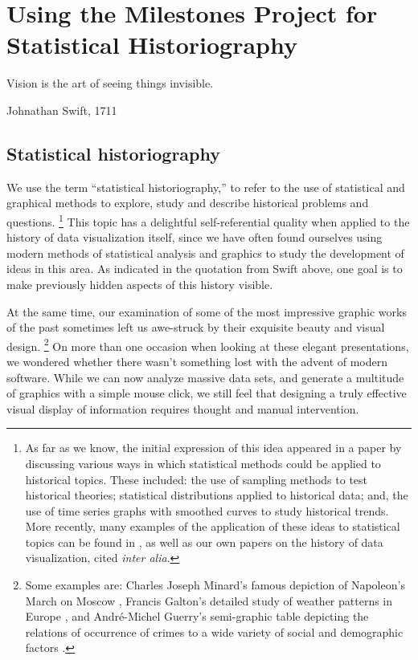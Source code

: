 \section{Using the Milestones Project for Statistical Historiography}\label{sec:historiography}
\epigraph{Vision is the art of seeing things invisible.}{Johnathan Swift, 1711}

\subsection{Statistical historiography}\label{sec:stathist}
We use the term ``statistical historiography,'' to refer to the use of statistical and graphical methods to explore, study and describe historical problems and questions.%
\footnote{As far as we know, the initial expression of this idea appeared in a paper by \citet{Rubin:1943} discussing various ways in which statistical methods could be applied to historical topics.  These included: the use of sampling methods to test historical theories; statistical distributions applied to historical data; and, the use of time series graphs with smoothed curves to study historical trends. More recently, many examples of the application of these ideas to statistical topics can be found in \citet{Stigler:1986,Stigler:1999}, as well as our own papers on the history of data visualization, cited \emph{inter alia}.}
This topic has a delightful self-referential quality when applied to the history of data visualization itself, 
since we have often found ourselves using modern methods of statistical analysis and graphics to study the development of ideas in this area. 
As indicated in the quotation from Swift above, one goal is to make previously hidden aspects of this history visible.

At the same time, our examination of some of the most impressive graphic works of the past sometimes left us awe-struck by their exquisite beauty and visual design.%
\footnote{Some examples are: Charles Joseph Minard's famous depiction of Napoleon's March on Moscow \citep{Friendly:02:Minard}, Francis Galton's detailed study of weather patterns in Europe \citep[see:][]{Friendly:2008:golden}, and Andr{\'e}-Michel Guerry's \citep[Plate 17]{Guerry:1864} semi-graphic table depicting the relations of occurrence of crimes to a wide variety of social and demographic factors \citep[see:][]{Friendly:2007:guerry}.}
On more than one occasion when looking at these elegant presentations, we wondered whether there wasn't something lost with the advent of modern software. While we can now analyze massive data sets, and generate a multitude of graphics with a simple mouse click, we still feel that designing a truly effective visual display of information requires thought and manual intervention.

